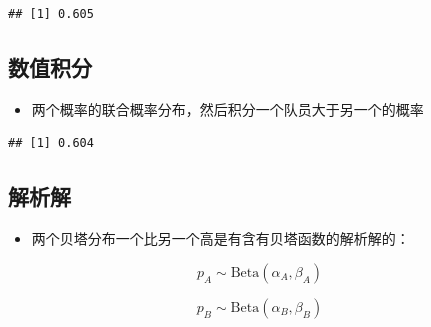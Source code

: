 \documentclass[
]{book}
\newenvironment{Shaded}{\begin{snugshade}}{\end{snugshade}}
\newcommand{\ControlFlowTok}[1]{\textcolor[rgb]{0.13,0.29,0.53}{\textbf{#1}}}
\newcommand{\DecValTok}[1]{\textcolor[rgb]{0.00,0.00,0.81}{#1}}
\newcommand{\FloatTok}[1]{\textcolor[rgb]{0.00,0.00,0.81}{#1}}
\newcommand{\KeywordTok}[1]{\textcolor[rgb]{0.13,0.29,0.53}{\textbf{#1}}}
\newcommand{\NormalTok}[1]{#1}
\newcommand{\OperatorTok}[1]{\textcolor[rgb]{0.81,0.36,0.00}{\textbf{#1}}}
\newcommand{\StringTok}[1]{\textcolor[rgb]{0.31,0.60,0.02}{#1}}
\providecommand{\tightlist}{%
  \setlength{\itemsep}{0pt}\setlength{\parskip}{0pt}}
\begin{document}
\begin{verbatim}
## [1] 0.605
\end{verbatim}

\hypertarget{ux6570ux503cux79efux5206}{%
\subsection{数值积分}\label{ux6570ux503cux79efux5206}}

\begin{itemize}
\tightlist
\item
  两个概率的联合概率分布，然后积分一个队员大于另一个的概率
\end{itemize}

\begin{Shaded}
\end{Shaded}

\begin{verbatim}
## [1] 0.604
\end{verbatim}

\hypertarget{ux89e3ux6790ux89e3}{%
\subsection{解析解}\label{ux89e3ux6790ux89e3}}

\begin{itemize}
\tightlist
\item
  两个贝塔分布一个比另一个高是有含有贝塔函数的解析解的：
\end{itemize}

\[p_A \sim \mbox{Beta}(\alpha_A, \beta_A)\]

\[p_B \sim \mbox{Beta}(\alpha_B, \beta_B)\]
\end{document}
